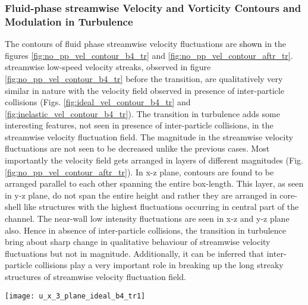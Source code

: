 \documentclass[aip,graphicx]{revtex4-1}
\begin{document}
\subsubsection{\textbf{Fluid-phase streamwise Velocity and Vorticity Contours and Modulation in Turbulence}}
\label{sec:slip_prod_trans}
The contours of fluid phase streamwise velocity fluctuations are \textcolor{black}{shown} in the figures \ref{fig:no_pp_vel_contour_b4_tr} and \ref{fig:no_pp_vel_contour_aftr_tr}. streamwise low-speed velocity streaks, observed in figure \ref{fig:no_pp_vel_contour_b4_tr} before the transition, are qualitatively very similar in nature with the velocity field observed in presence of inter-particle collisions (Figs. \ref{fig:ideal_vel_contour_b4_tr} and
\ref{fig:inelastic_vel_contour_b4_tr}). The transition in turbulence adds some interesting features, not seen in presence of inter-particle collisions, in the streamwise velocity fluctuation field. The magnitude in the streamwise velocity fluctuations are not seen to be decreased unlike the previous cases. Most importantly the velocity field gets arranged in layers of different magnitudes (Fig.\ref{fig:no_pp_vel_contour_aftr_tr}). In x-z plane, contours are found to be arranged parallel to each other spanning the entire box-length. This layer, as seen in y-z plane, do not span the entire height and rather they are arranged in core-shell like structures with the highest fluctuations occurring in central part of the channel. The near-wall low intensity fluctuations are seen in x-z and y-z plane also. Hence in absence of inter-particle collisions, the transition in turbulence bring about sharp change in qualitative behaviour of streamwise velocity fluctuations but not in magnitude. Additionally, it can be inferred that inter-particle collisions play a very important role in breaking up the long streaky structures of streamwise velocity fluctuation field. 
\begin{figure*}[h!]
\centering
\texttt{[image: u\_x\_3\_plane\_ideal\_b4\_tr1]}
	\caption{Contours of streamwise velocity fluctuations of fluid phase laden with particles of Volume Fraction $\phi_{cr}=8.75X10^{-4}$ showed in three different planes as shown in the figures in absence of inter-particle collision} 
	\label{fig:no_pp_vel_contour_b4_tr}
\end{figure*}
\end{document}
